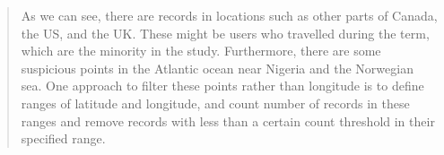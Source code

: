 \documentclass[11pt]{article}
\begin{document}
    

    \begin{quote}
As we can see, there are records in locations such as other parts of
Canada, the US, and the UK. These might be users who travelled during
the term, which are the minority in the study. Furthermore, there are
some suspicious points in the Atlantic ocean near Nigeria and the
Norwegian sea. One approach to filter these points rather than longitude
is to define ranges of latitude and longitude, and count number of
records in these ranges and remove records with less than a certain
count threshold in their specified range.
\end{quote}


    
    
    
    
\end{document}
